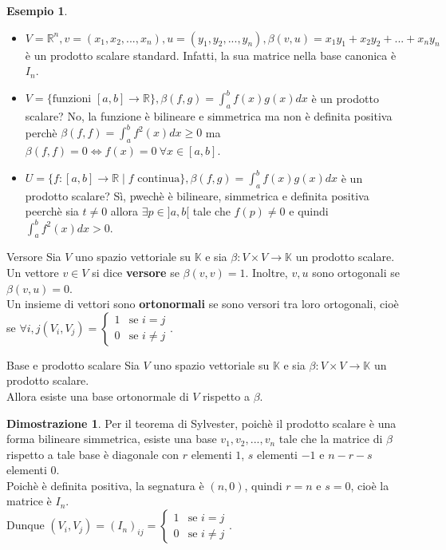 \documentclass[a4paper]{article}
\theoremstyle{definition}
\newtheorem*{dimm}{Dimostrazione}
\newtheorem*{es}{Esempio}
\begin{document}
	\begin{es}
		\begin{itemize}
			\item $V = \mathbb{R}^n, v = (x_1, x_2, ..., x_n), u = (y_1, y_2, ..., y_n), \beta(v, u) = x_1y_1 + x_2y_2 + ... + x_ny_n$ è un prodotto scalare standard.
			Infatti, la sua matrice nella base canonica è $I_n$.
			\item $V = \{\text{funzioni } [a, b] \to \mathbb{R}\}, \beta(f, g) = \int_a^b f(x)g(x)dx$ è un prodotto scalare?
			No, la funzione è bilineare e simmetrica ma non è definita positiva perchè $\beta(f, f) = \int_a^b f^2(x)dx \ge 0$ ma $\beta(f, f) = 0 \Leftrightarrow f(x) = 0 \ \forall x \in [a, b]$.
			\item $U = \{f: [a, b] \to \mathbb{R} \mid f \text{ continua}\}, \beta(f, g) = \int_a^b f(x)g(x)dx$ è un prodotto scalare?
			Sì, pwechè è bilineare, simmetrica e definita positiva peerchè sia $t \ne 0$ allora $\exists p \in ]a, b[$ tale che $f(p) \ne 0$ e quindi $\int_a^b f^2(x)dx > 0$.
		\end{itemize}
	\end{es}

	\begin{deff}{Versore}{}
		Sia $V$ uno spazio vettoriale su $\mathbb{K}$ e sia $\beta: V \times V \to \mathbb{K}$ un prodotto scalare. \\
		Un vettore $v \in V$ si dice \textbf{versore} se $\beta(v, v) = 1$.
		Inoltre, $v, u$ sono ortogonali se $\beta(v, u) = 0$. \\
		Un insieme di vettori sono \textbf{ortonormali} se sono versori tra loro ortogonali, cioè se $\forall i, j (V_i, V_j) = \begin{cases}
			1 & \text{se } i = j \\
			0 & \text{se } i \ne j
		\end{cases}$.
	\end{deff}

	\begin{teo}{Base e prodotto scalare}{}
		Sia $V$ uno spazio vettoriale su $\mathbb{K}$ e sia $\beta: V \times V \to \mathbb{K}$ un prodotto scalare. \\
		Allora esiste una base ortonormale di $V$ rispetto a $\beta$.
	\end{teo}
	\begin{dimm}
		Per il teorema di Sylvester, poichè il prodotto scalare è una forma bilineare simmetrica,
		esiste una base $v_1, v_2, ..., v_n$ tale che la matrice di $\beta$ rispetto a tale base è diagonale con $r$ elementi $1$, $s$ elementi $-1$ e $n - r - s$ elementi $0$. \\
		Poichè è definita positiva, la segnatura è $(n, 0)$, quindi $r = n$ e $s = 0$, cioè la matrice è $I_n$. \\
		Dunque $(V_i, V_j) = (I_n)_{ij} = \begin{cases}
			1 & \text{se } i = j \\
			0 & \text{se } i \ne j
		\end{cases}$.
	\end{dimm}
\end{document}
